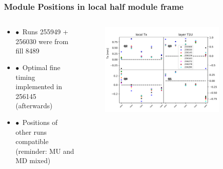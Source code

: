 \documentclass[aspectratio=1610, 12pt]{beamer}
\begin{document}
\begin{frame}\frametitle{Module Positions in local half module frame}
  \begin{columns}
    \begin{column}[c]{0.48\textwidth}
      \begin{itemize}
        \item $\bullet$\, Runs 255949 + 256030 were from fill 8489
        \item $\bullet$\, Optimal fine timing implemented in 256145 (afterwards)
        \item $\bullet$\, Positions of other runs compatible (reminder: MU and MD mixed)
      \end{itemize}
    \end{column}
    \begin{column}[c]{0.48\textwidth}
      \begin{figure}
        \includegraphics[width=0.9\textwidth]{plots/plain_data/raw_data_T1U_Tx.pdf}
      \end{figure}
    \end{column}
  \end{columns}
\end{frame}
\end{document}

